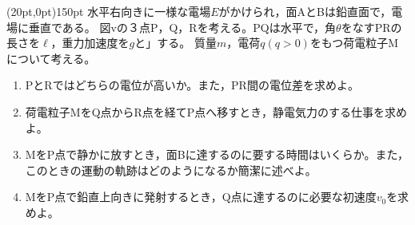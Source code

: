 \hakosyokika
\item
    \begin{mawarikomi}(20pt,0pt){150pt}{}
        水平右向きに一様な電場$E$がかけられ，面AとBは鉛直面で，電場に垂直である。
        図vの３点P，Q，Rを考える。PQは水平で，角$\theta $をなすPRの長さを$\ell $，重力加速度を$g$と」する。
        質量$m$，電荷$q$$(q>0)$をもつ荷電粒子Mについて考える。
        \begin{enumerate}
            \item PとRではどちらの電位が高いか。また，PR間の電位差を求めよ。
            \item 荷電粒子MをQ点からR点を経てP点へ移すとき，静電気力のする仕事を求めよ。
            \item MをP点で静かに放すとき，面Bに達するのに要する時間はいくらか。また，このときの運動の軌跡はどのようになるか簡潔に述べよ。
            \item MをP点で鉛直上向きに発射するとき，Q点に達するのに必要な初速度$v_0$を求めよ。
        \end{enumerate}
    \end{mawarikomi}

